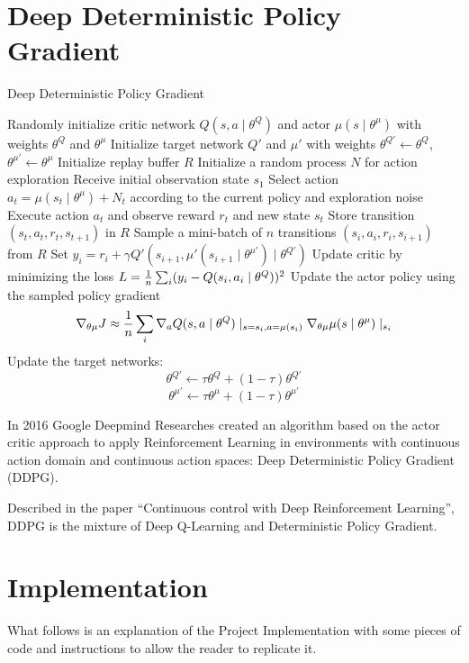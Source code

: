 \documentclass[Lau,oneside,noexaminfo]{sapthesis} %
\begin{document}
\chapter{Deep Deterministic Policy Gradient}
\label{DDPG}
\begin{algorithm}[H]
    \caption{Deep Deterministic Policy Gradient}
\begin{algorithmic}[0]
\STATE Randomly initialize critic network $Q(s,a\mid\theta^Q)$ and actor $\mu(s\mid\theta^\mu)$ with weights $\theta^Q$ and $\theta^\mu$
\STATE Initialize target network $Q'$ and $\mu'$ with weights $\theta^{Q'} \gets \theta^{Q}$, $\theta^{\mu'} \gets \theta^{\mu}$
\STATE Initialize replay buffer $R$
    \STATE Initialize a random process $N$ for action exploration
    \STATE Receive initial observation state $s_1$
        \STATE Select action $a_t=\mu(s_t \mid \theta^\mu) + N_t$ according to the current policy and exploration noise
       	\STATE Execute action $a_t$ and observe reward $r_t$ and new state $s_t$
        \STATE Store transition $(s_t, a_t, r_t, s_{t+1})$ in $R$
        \STATE Sample a mini-batch of $n$ transitions $(s_i, a_i, r_i, s_{i+1})$ from $R$
        \STATE Set $y_i = r_i + \gamma Q'(s_{i+1}, \mu'(s_{i+1} \mid \theta^{\mu'})\mid \theta^{Q'})$
        \STATE Update critic by minimizing the loss $L={1 \over n} \sum_i (y_i - Q(s_i, a_i \mid \theta^Q))^2$
        \STATE Update the actor policy using the sampled policy gradient $$ \nabla_{\theta \mu}J \approx {1 \over n} \sum_i \nabla_a Q(s,a \mid \theta^Q) \mid_{s=s_i, a=\mu(s_i)} \nabla_{\theta \mu} \mu(s \mid \theta^\mu) \mid_{s_i}$$
        \STATE Update the target networks: $$\theta^{Q'} \gets \tau \theta^{Q} + (1-\tau)\theta^{Q'}$$ $$\theta^{\mu'} \gets \tau \theta^{\mu} + (1-\tau)\theta^{\mu'}$$
    \ENDFOR
\ENDFOR
\end{algorithmic}
\end{algorithm}
In 2016 Google Deepmind Researches created an algorithm based on the actor critic approach to apply Reinforcement Learning in environments with continuous action domain and continuous action spaces: Deep Deterministic Policy Gradient (DDPG).

Described in the paper “Continuous control with Deep Reinforcement Learning”, DDPG is the mixture of Deep Q-Learning and Deterministic Policy Gradient.\cite{DDPG}
\chapter{Implementation}
What follows is an explanation of the Project Implementation with some pieces of code and instructions to allow the reader to replicate it.
\end{document}
